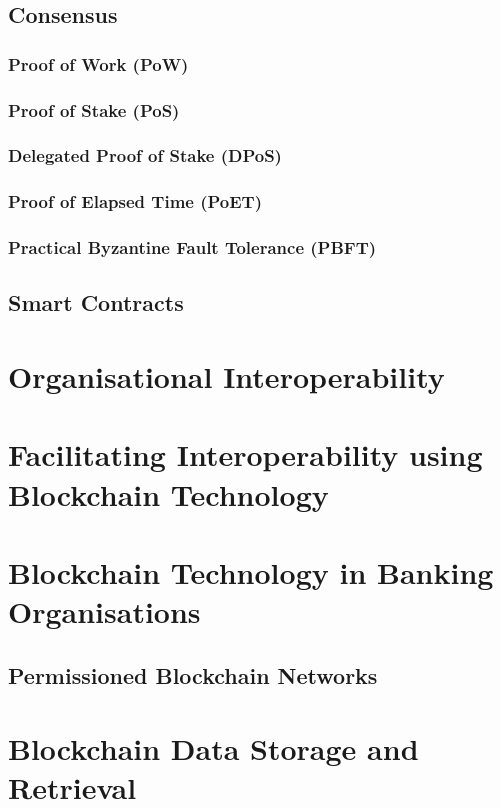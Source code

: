 \subsection{Consensus}

\subsubsection{Proof of Work (PoW)}

\subsubsection{Proof of Stake (PoS)}

\subsubsection{Delegated Proof of Stake (DPoS)}

\subsubsection{Proof of Elapsed Time (PoET)}

\subsubsection{Practical Byzantine Fault Tolerance (PBFT)}

\subsection{Smart Contracts}

\section{Organisational Interoperability}

\section{Facilitating Interoperability using Blockchain Technology}

\section{Blockchain Technology in Banking Organisations}

\subsection{Permissioned Blockchain Networks}

\section{Blockchain Data Storage and Retrieval}